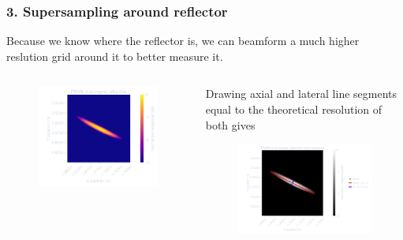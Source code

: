 \documentclass[compress,aspectratio=169]{beamer}
\begin{document}
\begin{frame} %
    \frametitle{3. Supersampling around reflector}
    Because we know where the reflector is, we can beamform a much higher reslution
    grid around it to better measure it.
    \begin{columns}
        \begin{column}{0.4\textwidth}
            \begin{figure}
                \includegraphics[width=\columnwidth]{"../5_2.pdf"}
            \end{figure}
        \end{column}
        \begin{column}{0.6\textwidth}
            Drawing axial and lateral line segments equal to the theoretical
            resolution of both gives
            \begin{figure}
                \includegraphics[width=\columnwidth]{"../6.pdf"}
            \end{figure}
        \end{column}
    \end{columns}
\end{frame} %
\end{document}
